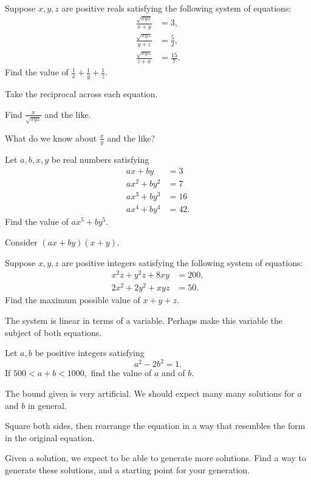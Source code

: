 \documentclass[../jarvis.tex]{subfiles}
\begin{document}
\problem[2018 SMO(S) P25]Suppose $x,y,z$ are positive reals satisfying the following system of equations:
\begin{align*}
    \frac{\sqrt{xyz}}{x+y}&=3,\\
    \frac{\sqrt{xyz}}{y+z}&=\frac{5}{2},\\
    \frac{\sqrt{xyz}}{z+x}&=\frac{15}{7}.
\end{align*}
Find the value of $\frac{1}{x}+\frac{1}{y}+\frac{1}{z}.$
\begin{hints}
    \begin{hint}
        Take the reciprocal across each equation.
    \end{hint}
    \begin{hint}
        Find $\frac{x}{\sqrt{xyz}}$ and the like.
    \end{hint}
    \begin{hint}
        What do we know about $\frac{x}{y}$ and the like?
    \end{hint}
\end{hints}
\problem[1990 AIME P15]Let $a,b,x,y$ be real numbers satisfying
\begin{align*}
    ax+by&=3 \\
    ax^2+by^2&=7 \\
    ax^3+by^3&=16 \\
    ax^4+by^4&=42.
\end{align*}
Find the value of $ax^5+by^5$.
\begin{hints}
    \begin{hint}
        Consider $(ax+by)(x+y)$.
    \end{hint}
\end{hints}
\problem[2019 SMO(S) P16]Suppose $x,y,z$ are positive integers satisfying the following system of equations:
\begin{align*}
    x^2z+y^2z+8xy&=200,\\
    2x^2+2y^2+xyz&=50.
\end{align*}
Find the maximum possible value of $x+y+z$.
\begin{hints}
    \begin{hint}
        The system is linear in terms of a variable. Perhaps make this variable the subject of both equations.
    \end{hint}
\end{hints}
\problem[2019 SMO(S) P25]Let $a,b$ be positive integers satisfying
$$a^2-2b^2=1.$$
If $500<a+b<1000,$ find the value of $a$ and of $b$.
\begin{hints}
    \begin{hint}
        The bound given is very artificial. We should expect many many solutions for $a$ and $b$ in general.
    \end{hint}
    \begin{hint}
        Square both sides, then rearrange the equation in a way that resembles the form in the original equation.
    \end{hint}
    \begin{hint}
        Given a solution, we expect to be able to generate more solutions. Find a way to generate these solutions, and a starting point for your generation.
    \end{hint}
\end{hints}
\end{document}
